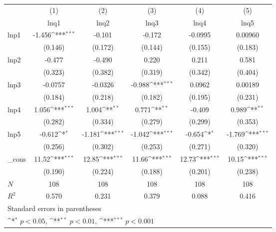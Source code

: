 {
\def\sym#1{\ifmmode^{#1}\else\(^{#1}\)\fi}
\begin{tabular}{l*{5}{c}}
\hline\hline
            &\multicolumn{1}{c}{(1)}&\multicolumn{1}{c}{(2)}&\multicolumn{1}{c}{(3)}&\multicolumn{1}{c}{(4)}&\multicolumn{1}{c}{(5)}\\
            &\multicolumn{1}{c}{lnq1}&\multicolumn{1}{c}{lnq2}&\multicolumn{1}{c}{lnq3}&\multicolumn{1}{c}{lnq4}&\multicolumn{1}{c}{lnq5}\\
\hline
lnp1        &      -1.456\sym{***}&      -0.101         &      -0.172         &     -0.0995         &     0.00960         \\
            &     (0.146)         &     (0.172)         &     (0.144)         &     (0.155)         &     (0.183)         \\
[1em]
lnp2        &      -0.477         &      -0.490         &       0.220         &       0.211         &       0.581         \\
            &     (0.323)         &     (0.382)         &     (0.319)         &     (0.342)         &     (0.404)         \\
[1em]
lnp3        &     -0.0757         &     -0.0326         &      -0.988\sym{***}&      0.0962         &     0.00189         \\
            &     (0.184)         &     (0.218)         &     (0.182)         &     (0.195)         &     (0.231)         \\
[1em]
lnp4        &       1.056\sym{***}&       1.004\sym{**} &       0.771\sym{**} &      -0.409         &       0.989\sym{**} \\
            &     (0.282)         &     (0.334)         &     (0.279)         &     (0.299)         &     (0.353)         \\
[1em]
lnp5        &      -0.612\sym{*}  &      -1.181\sym{***}&      -1.042\sym{***}&      -0.654\sym{*}  &      -1.769\sym{***}\\
            &     (0.256)         &     (0.302)         &     (0.253)         &     (0.271)         &     (0.320)         \\
[1em]
\_cons      &       11.52\sym{***}&       12.85\sym{***}&       11.66\sym{***}&       12.73\sym{***}&       10.15\sym{***}\\
            &     (0.190)         &     (0.224)         &     (0.188)         &     (0.201)         &     (0.238)         \\
\hline
\(N\)       &         108         &         108         &         108         &         108         &         108         \\
\(R^{2}\)   &       0.570         &       0.231         &       0.379         &       0.088         &       0.416         \\
\hline\hline
\multicolumn{6}{l}{\footnotesize Standard errors in parentheses}\\
\multicolumn{6}{l}{\footnotesize \sym{*} \(p<0.05\), \sym{**} \(p<0.01\), \sym{***} \(p<0.001\)}\\
\end{tabular}
}

